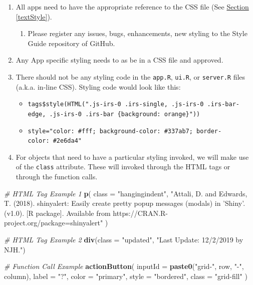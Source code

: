 \documentclass[
]{book}
\newenvironment{Shaded}{\begin{snugshade}}{\end{snugshade}}
\newcommand{\CommentTok}[1]{\textcolor[rgb]{0.56,0.35,0.01}{\textit{#1}}}
\newcommand{\DataTypeTok}[1]{\textcolor[rgb]{0.13,0.29,0.53}{#1}}
\newcommand{\KeywordTok}[1]{\textcolor[rgb]{0.13,0.29,0.53}{\textbf{#1}}}
\newcommand{\NormalTok}[1]{#1}
\newcommand{\StringTok}[1]{\textcolor[rgb]{0.31,0.60,0.02}{#1}}
\providecommand{\tightlist}{%
  \setlength{\itemsep}{0pt}\setlength{\parskip}{0pt}}
\begin{document}
\begin{enumerate}
\def\labelenumi{\arabic{enumi}.}
\tightlist
\item
  All apps need to have the appropriate reference to the CSS file (See \protect\hyperlink{textStyle}{Section \ref{textStyle}}).

  \begin{enumerate}
  \def\labelenumii{\alph{enumii}.}
  \tightlist
  \item
    Please register any issues, bugs, enhancements, new styling to the Style Guide repository of GitHub.
  \end{enumerate}
\item
  Any App specific styling needs to as be in a CSS file and approved.
\item
  There should not be any styling code in the \texttt{app.R}, \texttt{ui.R}, or \texttt{server.R} files (a.k.a. in-line CSS). Styling code would look like this:

  \begin{itemize}
  \tightlist
  \item
    \texttt{tags\$style(HTML(".js-irs-0\ .irs-single,\ .js-irs-0\ .irs-bar-edge,\ .js-irs-0\ .irs-bar\ \{background:\ orange\}"))}~\\
  \item
    \texttt{style="color:\ \#fff;\ background-color:\ \#337ab7;\ border-color:\ \#2e6da4"}
  \end{itemize}
\item
  For objects that need to have a particular styling invoked, we will make use of the \texttt{class} attribute. These will invoked through the HTML tags or through the function calls.
\end{enumerate}

\begin{Shaded}
\begin{Highlighting}[]
\CommentTok{# HTML Tag Example 1}
\KeywordTok{p}\NormalTok{(}
  \DataTypeTok{class =} \StringTok{"hangingindent"}\NormalTok{,}
  \StringTok{"Attali, D. and Edwards, T. (2018). shinyalert: Easily create}
\StringTok{  pretty popup messages (modals) in 'Shiny'. (v1.0). [R package].}
\StringTok{  Available from https://CRAN.R-project.org/package=shinyalert"}
\NormalTok{)}

\CommentTok{# HTML Tag Example 2}
\KeywordTok{div}\NormalTok{(}\DataTypeTok{class =} \StringTok{"updated"}\NormalTok{, }\StringTok{"Last Update: 12/2/2019 by NJH."}\NormalTok{)}

\CommentTok{# Function Call Example}
\KeywordTok{actionButton}\NormalTok{(}
  \DataTypeTok{inputId =} \KeywordTok{paste0}\NormalTok{(}\StringTok{"grid-"}\NormalTok{, row, }\StringTok{"-"}\NormalTok{, column),}
  \DataTypeTok{label =} \StringTok{"?"}\NormalTok{,}
  \DataTypeTok{color =} \StringTok{"primary"}\NormalTok{,}
  \DataTypeTok{style =} \StringTok{"bordered"}\NormalTok{,}
  \DataTypeTok{class =} \StringTok{"grid-fill"}
\NormalTok{)}
\end{Highlighting}
\end{Shaded}
\end{document}
